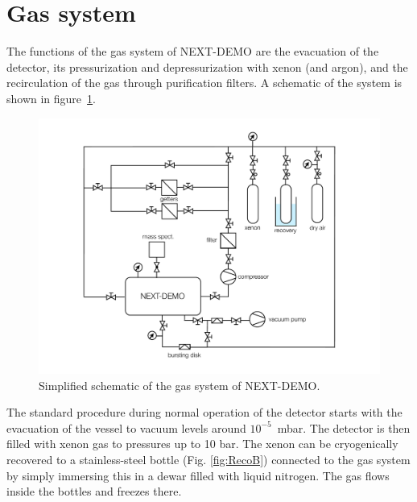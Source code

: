 \section{Gas system} \label{sec:GasSystem}

The functions of the gas system of NEXT-DEMO are the evacuation of the detector, its pressurization and depressurization with xenon (and argon), and the recirculation of the gas through purification filters. A schematic of the system is shown in figure~\ref{fig:GasSystem}.

\begin{figure}[tbh]
\centering
\includegraphics[width=\textwidth]{img/GasSystem.pdf}
\caption{Simplified schematic of the gas system of NEXT-DEMO.} \label{fig:GasSystem}
\end{figure}

The standard procedure during normal operation of the detector starts with the evacuation of the vessel to vacuum levels around $10^{-5}$~mbar. The detector is then filled with xenon gas to pressures up to 10 bar. The xenon can be cryogenically recovered to a stainless-steel bottle (Fig. \ref{fig:RecoB}) connected to the gas system by simply immersing this in a dewar filled with liquid nitrogen. The gas flows inside the bottles and freezes there.

